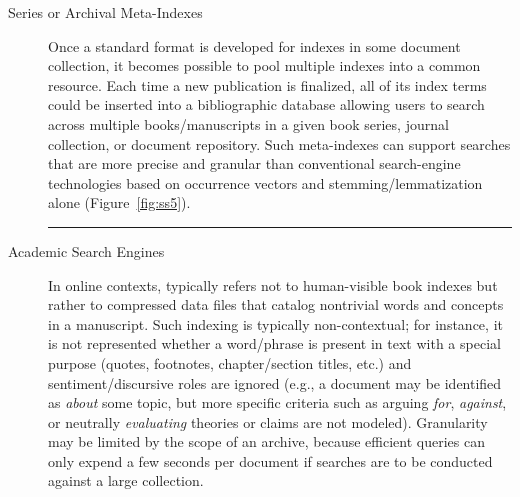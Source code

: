 \documentclass[11pt]{article}
\begin{document}
{{\begin{description}
\item[Series or Archival Meta-Indexes]  Once a standard format 
is developed for indexes in some document collection, it becomes 
possible to pool multiple indexes into a common resource.  
Each time a new publication is finalized, all of its index 
terms could be inserted into a bibliographic database 
allowing users to search across multiple books/manuscripts 
in a given book series, journal %
collection, or document repository.  Such meta-indexes can support searches 
that are more precise and granular than conventional
search-engine technologies based on occurrence vectors 
and stemming/lemmatization alone (Figure~\ref{fig:ss5}).


\par\noindent\vspace*{-17.5pt}\textcolor{white}{\rule{\textwidth}{0.4pt}}

\item[Academic Search Engines]  In online contexts,  typically 
refers not to human-visible book indexes but rather to 
compressed data files that catalog nontrivial words 
and concepts in a manuscript.  Such indexing is typically 
non-contextual; for instance, it is not represented whether a 
word/phrase is present in text with a special purpose 
(quotes, footnotes, chapter/section titles, etc.) and 
sentiment/discursive roles are ignored (e.g., a document may be identified as 
\textit{about} some topic, but more specific criteria 
such as arguing \textit{for}, \textit{against}, or neutrally 
\textit{evaluating} theories or claims are not modeled).  
Granularity may be limited by the scope of an archive, because 
efficient queries can only expend a few seconds per 
document if searches are to be conducted against a large collection.  


\end{description}}}
\end{document}
